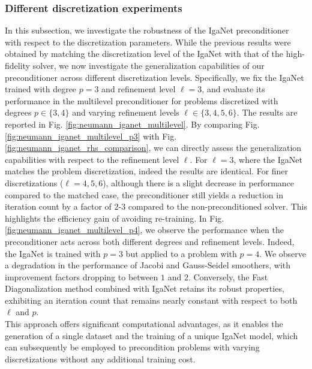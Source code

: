 \documentclass{article}
\newcommand{\reflevel}{\ell} %
\theoremstyle{plain}
\numberwithin{equation}{section}
\begin{document}
\subsubsection{Different discretization experiments}
In this subsection, we investigate the robustness of the IgaNet preconditioner with respect to the discretization parameters. While the previous results were obtained by matching the discretization level of the IgaNet with that of the high-fidelity solver, we now investigate the generalization capabilities of our preconditioner across different discretization levels. Specifically, we fix the IgaNet trained with degree $p=3$ and refinement level $\reflevel=3$, and evaluate its performance in the multilevel preconditioner for problems discretized with degrees $p \in \{3, 4\}$ and varying refinement levels $\reflevel \in \{3, 4, 5, 6\}$.
The results are reported in Fig. \ref{fig:neumann_iganet_multilevel}. By comparing Fig. \ref{fig:neumann_iganet_multilevel_p3} with Fig. \ref{fig:neumann_iganet_rhs_comparison}, we can directly assess the generalization capabilities with respect to the  refinement level $\reflevel$. For $\reflevel=3$, where the IgaNet matches the problem discretization, indeed the results are identical. For finer discretizations ($\reflevel=4, 5, 6$), although there is a slight decrease in performance compared to the matched case, the preconditioner still yields a reduction in iteration count by a factor of $2$-$3$ compared to the non-preconditioned solver. This highlights the efficiency gain of avoiding re-training.
In Fig. \ref{fig:neumann_iganet_multilevel_p4}, we observe the performance when the preconditioner acts across both different degrees and refinement levels. Indeed, the IgaNet is trained with $p=3$ but applied to a problem with $p=4$. We observe a degradation in the performance of Jacobi and Gauss-Seidel smoothers, with improvement factors dropping to between $1$ and $2$. Conversely, the Fast Diagonalization method combined with IgaNet retains its robust properties, exhibiting an iteration count that remains nearly constant with respect to both $\reflevel$ and $p$.
\\
This approach offers significant computational advantages, as it enables the generation of a single dataset and the training of a unique IgaNet model, which can subsequently be employed to precondition problems with varying discretizations without any additional training cost.
\end{document}
